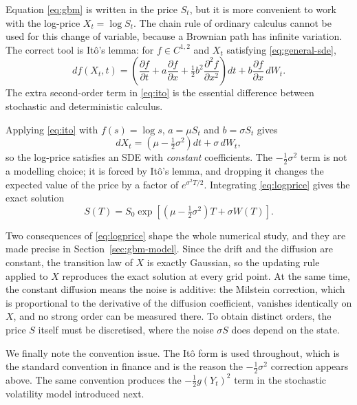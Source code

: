 \documentclass[11pt,a4paper]{article}
\theoremstyle{definition}
\theoremstyle{remark}
\begin{document}
Equation \eqref{eq:gbm} is written in the price $S_t$, but it is more
convenient to work with the log-price $X_t = \log S_t$. The chain rule of
ordinary calculus cannot be used for this change of variable, because a
Brownian path has infinite variation. The correct tool is It\^o's lemma: for
$f \in C^{1,2}$ and $X_t$ satisfying \eqref{eq:general-sde},
\begin{equation}
    df(X_t, t) =
    \left( \frac{\partial f}{\partial t}
         + a \frac{\partial f}{\partial x}
         + \tfrac12 b^2 \frac{\partial^2 f}{\partial x^2} \right) dt
    + b \frac{\partial f}{\partial x}\, dW_t .
    \label{eq:ito}
\end{equation}
The extra second-order term in \eqref{eq:ito} is the essential difference
between stochastic and deterministic calculus.

Applying \eqref{eq:ito} with $f(s) = \log s$, $a = \mu S_t$ and
$b = \sigma S_t$ gives
\begin{equation}
    dX_t = \left( \mu - \tfrac12 \sigma^2 \right) dt + \sigma\, dW_t ,
    \label{eq:logprice}
\end{equation}
so the log-price satisfies an SDE with \emph{constant} coefficients. The
$-\tfrac12\sigma^2$ term is not a modelling choice; it is forced by It\^o's
lemma, and dropping it changes the expected value of the price by a factor of
$e^{\sigma^2 T/2}$. Integrating \eqref{eq:logprice} gives the exact solution
\begin{equation}
    S(T) = S_0 \exp\left[ \left( \mu - \tfrac12 \sigma^2 \right) T
                        + \sigma W(T) \right] .
    \label{eq:gbm-exact}
\end{equation}

Two consequences of \eqref{eq:logprice} shape the whole numerical study, and
they are made precise in Section~\ref{sec:gbm-model}. Since the drift and the
diffusion are constant, the transition law of $X$ is exactly Gaussian, so the
updating rule applied to $X$ reproduces the exact solution at every grid point.
At the same time, the constant diffusion means the noise is additive: the
Milstein correction, which is proportional to the derivative of the diffusion
coefficient, vanishes identically on $X$, and no strong order can be measured
there. To obtain distinct orders, the price $S$ itself must be discretised,
where the noise $\sigma S$ does depend on the state.

We finally note the convention issue. The It\^o form is used throughout, which
is the standard convention in finance and is the reason the $-\tfrac12\sigma^2$
correction appears above. The same convention produces the
$-\tfrac12 g(Y_t)^2$ term in the stochastic volatility model introduced next.
\end{document}

